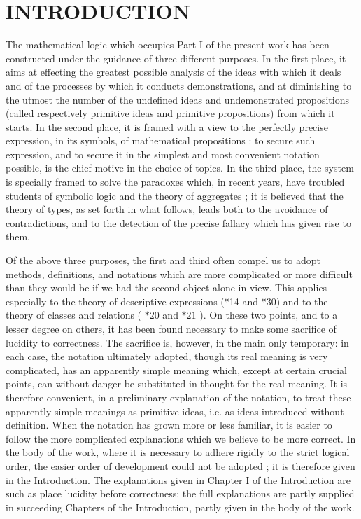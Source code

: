 \documentclass[10pt]{article}
\begin{document}
\section*{INTRODUCTION}
The mathematical logic which occupies Part I of the present work has been constructed under the guidance of three different purposes. In the first place, it aims at effecting the greatest possible analysis of the ideas with which it deals and of the processes by which it conducts demonstrations, and at diminishing to the utmost the number of the undefined ideas and undemonstrated propositions (called respectively primitive ideas and primitive propositions) from which it starts. In the second place, it is framed with a view to the perfectly precise expression, in its symbols, of mathematical propositions : to secure such expression, and to secure it in the simplest and most convenient notation possible, is the chief motive in the choice of topics. In the third place, the system is specially framed to solve the paradoxes which, in recent years, have troubled students of symbolic logic and the theory of aggregates ; it is believed that the theory of types, as set forth in what follows, leads both to the avoidance of contradictions, and to the detection of the precise fallacy which has given rise to them.

Of the above three purposes, the first and third often compel us to adopt methods, definitions, and notations which are more complicated or more difficult than they would be if we had the second object alone in view. This applies especially to the theory of descriptive expressions (*14 and *30) and to the theory of classes and relations ( $* 20$ and $* 21$ ). On these two points, and to a lesser degree on others, it has been found necessary to make some sacrifice of lucidity to correctness. The sacrifice is, however, in the main only temporary: in each case, the notation ultimately adopted, though its real meaning is very complicated, has an apparently simple meaning which, except at certain crucial points, can without danger be substituted in thought for the real meaning. It is therefore convenient, in a preliminary explanation of the notation, to treat these apparently simple meanings as primitive ideas, i.e. as ideas introduced without definition. When the notation has grown more or less familiar, it is easier to follow the more complicated explanations which we believe to be more correct. In the body of the work, where it is necessary to adhere rigidly to the strict logical order, the easier order of development could not be adopted ; it is therefore given in the Introduction. The explanations given in Chapter I of the Introduction are such as place lucidity before correctness; the full explanations are partly supplied in succeeding Chapters of the Introduction, partly given in the body of the work.
\end{document}
